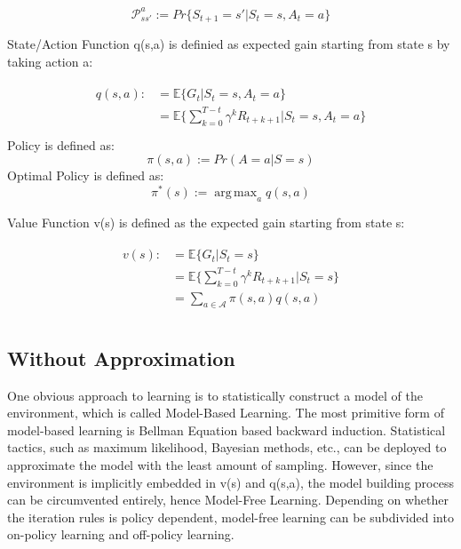 \documentclass[journal]{IEEEtran}
\DeclareMathOperator*{\argmax}{arg\,max}  %
\begin{document}
\begin{equation}
    \mathcal{P}_{ss'}^a := Pr\{S_{t+1}=s'|S_{t}=s,A_{t}=a\}
\end{equation}


State/Action Function q(s,a) is definied as expected gain starting from state s by taking action a:

\begin{align}
\begin{split}
    q(s,a) :&= \mathbb{E}\{G_t|S_t=s,A_t=a\}\\
    &=\mathbb{E} \{\sum_{k=0}^{T-t} \gamma ^k R_{t+k+1}| S_t=s,A_t=a\}\\
\end{split}
\end{align}
Policy is defined as:
\begin{equation}
    \pi(s,a):=Pr(A=a|S=s)
\end{equation}
Optimal Policy is defined as:
\begin{equation}
    \pi^*(s):=\argmax_a q(s,a)
\end{equation}


Value Function v(s) is defined as the expected gain starting from state s:

\begin{align}
\begin{split}
    v(s) :&=  \mathbb{E}\{G_t|S_t=s\}\\
    &=\mathbb{E} \{\sum_{k=0}^{T-t} \gamma ^k R_{t+k+1}| S_t=s\}\\
    &=\sum_{a \in \mathcal{A}} \pi(s,a) q(s,a)\\
\end{split}
\end{align}

\subsection{Without Approximation}
One obvious approach to learning is to statistically construct a model of the environment, which is called Model-Based Learning. The most primitive form of model-based learning is Bellman Equation based backward induction. Statistical tactics, such as maximum likelihood, Bayesian methods, etc., can be deployed to approximate the model with the least amount of sampling. However, since the environment is implicitly embedded in v(s) and q(s,a), the model building process can be circumvented entirely, hence Model-Free Learning. Depending on whether the iteration rules is policy dependent, model-free learning can be subdivided into on-policy learning and off-policy learning.
\end{document}
